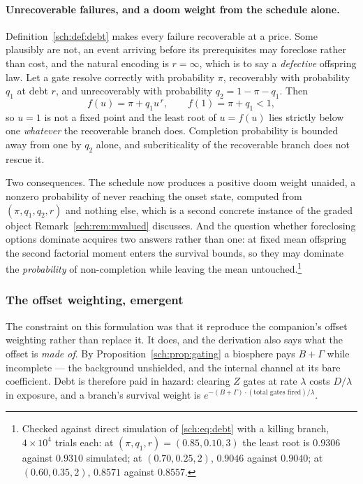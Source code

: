 \documentclass[11pt]{article}
\numberwithin{equation}{section}
\theoremstyle{plain}
\theoremstyle{definition}
\theoremstyle{remark}
\begin{document}
\paragraph{Unrecoverable failures, and a doom weight from the
schedule alone.}\label{sch:rem:defective}
Definition~\ref{sch:def:debt} makes every failure recoverable at a
price. Some plausibly are not, an event arriving before its
prerequisites may foreclose rather than cost, and the natural
encoding is $r=\infty$, which is to say a \emph{defective} offspring
law. Let a gate resolve correctly with probability $\pi$, recoverably
with probability $q_1$ at debt $r$, and unrecoverably with probability
$q_2=1-\pi-q_1$. Then
\begin{equation}\label{sch:eq:defective}
f(u)=\pi+q_1u^{\,r},\qquad f(1)=\pi+q_1<1,
\end{equation}
so $u=1$ is not a fixed point and the least root of $u=f(u)$ lies
strictly below one \emph{whatever} the recoverable branch does.
Completion probability is bounded away from one by $q_2$ alone, and
subcriticality of the recoverable branch does not rescue it.

Two consequences. The schedule now produces a positive doom weight
unaided, a nonzero probability of never reaching the onset state,
computed from $(\pi,q_1,q_2,r)$ and nothing else, which is a second
concrete instance of the graded object
Remark~\ref{sch:rem:mvalued} discusses. And the question whether
foreclosing options dominate acquires two answers rather than one: at
fixed mean offspring the second factorial moment enters the survival
bounds, so they may dominate the \emph{probability} of non-completion
while leaving the mean untouched.\footnote{Checked
against direct simulation of \eqref{sch:eq:debt} with a killing branch,
$4\times10^{4}$ trials each: at $(\pi,q_1,r)=(0.85,0.10,3)$ the least
root is $0.9306$ against $0.9310$ simulated; at $(0.70,0.25,2)$,
$0.9046$ against $0.9040$; at $(0.60,0.35,2)$, $0.8571$ against
$0.8557$.}

\subsubsection{The offset weighting, emergent}\label{sch:subsub:emergent}

The constraint on this formulation was that it reproduce the companion's
offset weighting rather than replace it. It does, and the derivation
also says what the offset is \emph{made of}. By Proposition~\ref{sch:prop:gating} a biosphere pays $B+\Gamma$ while
incomplete --- the background unshielded, and the internal channel at its
bare coefficient. Debt is therefore paid in hazard: clearing $Z$ gates at
rate $\lambda$ costs $D/\lambda$ in exposure, and a branch's survival
weight is $e^{-(B+\Gamma)\cdot(\text{total gates fired})/\lambda}$.
\end{document}
